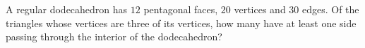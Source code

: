 A regular dodecahedron has $12$ pentagonal faces, $20$ vertices and $30$ edges. Of the triangles whose vertices are three of its vertices, how many have at least one side passing through the interior of the dodecahedron?
